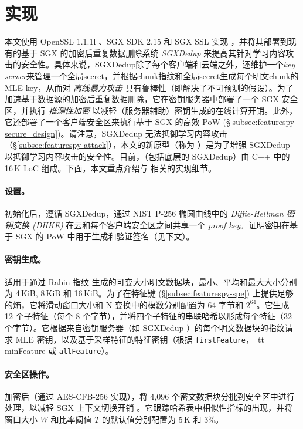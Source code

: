 \section{实现}
\label{sec:featurespy-implementation}
本文使用 OpenSSL 1.1.1l \cite{openssl}、SGX SDK 2.15 \cite{sgxsdk} 和 SGX SSL \cite{sgxssl} 实现 \sysnameF，并将其部署到现有的基于 SGX 的加密后重复数据删除系统 {\em SGXDedup} \cite{ren21} 来提高其针对学习内容攻击的安全性。具体来说，SGXDedup除了每个客户端和云端之外，还维护一个{\em key server}来管理一个全局secret，并根据chunk指纹和全局secret生成每个明文chunk的MLE key，从而对 {\em 离线暴力攻击} 具有鲁棒性（即解决了不可预测的假设）\cite{bellare2013DupLESS}。为了加速基于数据源的加密后重复数据删除，它在密钥服务器中部署了一个 SGX 安全区，并执行 {\em 推测性加密} \cite{eduardo2019Speculative} 以减轻（服务器辅助）密钥生成的在线计算开销。此外，它还部署了一个客户端安全区来执行基于 SGX 的高效 PoW (\S\ref{subsec:featurespy-secure_design})。请注意，SGXDedup 无法抵御学习内容攻击（\S\ref{subsec:featurespy-attack}），本文的新原型（称为 \prototype）是为了增强 SGXDedup 以抵御学习内容攻击的安全性。目前，\prototype（包括底层的 SGXDedup）由 C++ 中的 16\,K LoC 组成。下面，本文重点介绍与 \prototype 相关的实现细节。


\paragraph*{设置。}
初始化后，\prototype 遵循 SGXDedup，通过 NIST P-256 椭圆曲线中的 {\em Diffie-Hellman 密钥交换 (DHKE)} 在云和每个客户端安全区之间共享一个 {\em proof key}。证明密钥在基于 SGX 的 PoW 中用于生成和验证签名（见下文）。


\paragraph*{密钥生成。}
\prototype 适用于通过 Rabin 指纹 \cite{rabin81} 生成的可变大小明文数据块，最小、平均和最大大小分别为 4\,KiB, 8\,KiB 和 16\,KiB。为了在特征键 (\S\ref{subsec:featurespy-spe}) 上提供足够的熵，它将滑动窗口大小和 N 变换中的模数分别配置为 64 字节和 $2^{64}$。它生成 12 个子特征（每个 8 个字节），并将四个子特征的串联哈希以形成每个特征（32 个字节）。它根据来自密钥服务器（如 SGXDedup \cite{ren21}）的每个明文数据块的指纹请求 MLE 密钥，以及基于采样特征的特征密钥（根据 {\tt firstFeature}，{\ tt minFeature} 或 {\tt allFeature}）。


\paragraph*{安全区操作。}
加密后（通过 AES-CFB-256 实现），\prototype 将 4,096 个密文数据块分批到安全区中进行处理，以减轻 SGX 上下文切换开销 \cite{arnautov2016SCONE}。它跟踪哈希表中相似性指标的出现，并将窗口大小 $W$ 和比率阈值 $T$ 的默认值分别配置为 5\,K 和 3\%。

